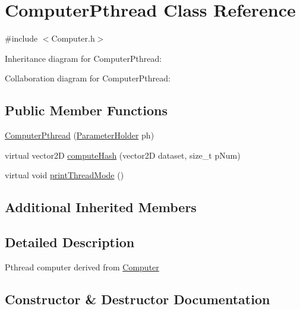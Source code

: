 \hypertarget{classComputerPthread}{}\section{Computer\+Pthread Class Reference}
\label{classComputerPthread}


{\ttfamily \#include $<$Computer.\+h$>$}



Inheritance diagram for Computer\+Pthread\+:


Collaboration diagram for Computer\+Pthread\+:
\subsection*{Public Member Functions}
\begin{DoxyCompactItemize}
\item 
\hyperlink{classComputerPthread_afbb4bf7244dcfd70eacb11297c8f008e}{Computer\+Pthread} (\hyperlink{structParameterHolder}{Parameter\+Holder} ph)
\item 
virtual vector2D \hyperlink{classComputerPthread_a0e96106f2890f96f6c4724148e3f8453}{compute\+Hash} (vector2D dataset, size\+\_\+t p\+Num)
\item 
virtual void \hyperlink{classComputerPthread_a1e5ea87a23518ffaa7bff3ee9df33009}{print\+Thread\+Mode} ()
\end{DoxyCompactItemize}
\subsection*{Additional Inherited Members}


\subsection{Detailed Description}
Pthread computer derived from \hyperlink{classComputer}{Computer} 

\subsection{Constructor \& Destructor Documentation}
